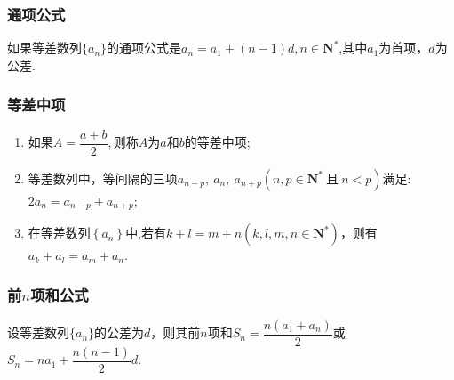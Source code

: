     \subsubsection{通项公式}
      如果等差数列$\{a_n\}$的通项公式是$ a_n=a_1+(n-1)d ,n\in\mathbf{N^*}$,其中$ a_1 $为首项，$ d $为公差.\\
    \subsubsection{等差中项}
      \begin{enumerate}[1)]
        \item 如果$ A=\dfrac{a+b}{2} ,$则称$ A $为$ a $和$ b $的等差中项;
        \item 等差数列中，等间隔的三项$a_{n-p},~a_n,~a_{n+p} (n,p\in\mathbf{N^*}~\text{且}~n<p) $满足:$ 2a_n=a_{n-p}+a_{n+p} $;
        \item 在等差数列$ \left\{a_n\right\} $中,若有$ k+l=m+n \left(k,l,m,n\in\mathbf{N^*}\right)$，则有$ a_k+a_l=a_m+a_n $.
      \end{enumerate}
    \subsubsection{前$ n $项和公式}
      设等差数列$\{a_n\}$的公差为$ d $，则其前$ n $项和$ S_n=\dfrac{n\left(a_1+a_n\right)}{2} $或$ S_n=na_1+\dfrac{n(n-1)}{2}d $.
